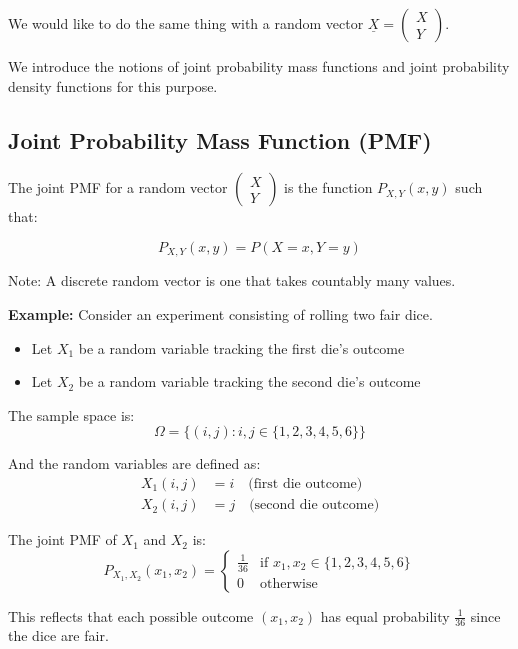 \documentclass{article}
\begin{document}
    We would like to do the same thing with a random vector $\underline{X} = \begin{pmatrix} X \\ Y \end{pmatrix}$.

    We introduce the notions of joint probability mass functions and joint probability density functions for this purpose.

    \subsection*{Joint Probability Mass Function (PMF)}

    The joint PMF for a random vector $\begin{pmatrix} X \\ Y \end{pmatrix}$ is the function $P_{X,Y}(x,y)$ such that:

    \[
        P_{X,Y}(x,y) = P(X = x, Y = y)
    \]

    Note: A discrete random vector is one that takes countably many values.

    \textbf{Example:} Consider an experiment consisting of rolling two fair dice.
    \begin{itemize}
        \item Let $X_1$ be a random variable tracking the first die's outcome
        \item Let $X_2$ be a random variable tracking the second die's outcome
    \end{itemize}

    The sample space is:
    \[ \Omega = \{(i,j) : i,j \in \{1,2,3,4,5,6\}\} \]

    And the random variables are defined as:
    \begin{align*}
        X_1(i,j) &= i \quad \text{(first die outcome)} \\
        X_2(i,j) &= j \quad \text{(second die outcome)}
    \end{align*}

    The joint PMF of $X_1$ and $X_2$ is:
    \[
    P_{X_1,X_2}(x_1,x_2) = 
    \begin{cases}
        \frac{1}{36} & \text{if } x_1,x_2 \in \{1,2,3,4,5,6\} \\
        0 & \text{otherwise}
    \end{cases}
    \]

    This reflects that each possible outcome $(x_1,x_2)$ has equal probability $\frac{1}{36}$ since the dice are fair.
\end{document}
